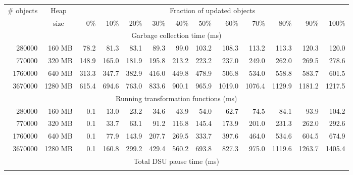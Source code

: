 \documentclass[9pt]{sigplanconf}
\newcommand\T{\rule{0pt}{2.0ex}}
\begin{document}
\begin{table}[t]
\begin{footnotesize}
\begin{center}
\begin{tabular}{|r|r|rrrrrrrrrrr|}
                                                                                                                                   \hline
\multirow{2}{*}{\# objects}     & \multicolumn{1}{c}{Heap}   & \multicolumn{11}{|c|}{Fraction of updated objects \T}            \\
                                & \multicolumn{1}{c|}{size}  &
                       0\%  &   10\%  &   20\%  &   30\%  &   40\%  &   50\%  &   60\%  &   70\%  &   80\%  &   90\%  &  100\%  \\ \hline
\multicolumn{13}{|c|}{Garbage collection time (ms) \T}                                                                          \\ \hline \T
 280000 &  160 MB &    78.2 &    81.3 &    83.1 &    89.3 &    99.0 &   103.2 &   108.3 &   113.2 &   113.3 &   120.3 &   120.0 \\
 770000 &  320 MB &   148.9 &   165.0 &   181.9 &   195.8 &   213.2 &   223.2 &   237.0 &   249.0 &   262.0 &   269.5 &   278.6 \\
1760000 &  640 MB &   313.3 &   347.7 &   382.9 &   416.0 &   449.8 &   478.9 &   506.8 &   534.0 &   558.8 &   583.7 &   601.5 \\
3670000 & 1280 MB &   615.4 &   694.6 &   763.0 &   833.6 &   900.1 &   965.9 &  1019.0 &  1076.4 &  1129.9 &  1181.2 &  1217.5 \\ \hline
\multicolumn{13}{|c|}{Running transformation functions (ms) \T}                                                                 \\ \hline \T
 280000 &  160 MB &     0.1 &    13.0 &    23.2 &    34.6 &    43.9 &    54.0 &    62.7 &    74.5 &    84.1 &    93.9 &   104.2 \\
 770000 &  320 MB &     0.1 &    33.7 &    63.1 &    91.2 &   116.8 &   145.4 &   173.9 &   201.0 &   231.3 &   262.0 &   292.6 \\
1760000 &  640 MB &     0.1 &    77.9 &   143.9 &   207.7 &   269.5 &   333.7 &   397.6 &   464.0 &   534.6 &   604.5 &   674.9 \\
3670000 & 1280 MB &     0.1 &   160.8 &   299.2 &   429.4 &   560.2 &   693.8 &   827.3 &   975.0 &  1119.6 &  1263.7 &  1405.4 \\ \hline
\multicolumn{13}{|c|}{Total DSU pause time (ms) \T}                                                                             \\ \hline \T

\end{tabular}
\end{center}
\end{footnotesize}
\end{table}
\end{document}
